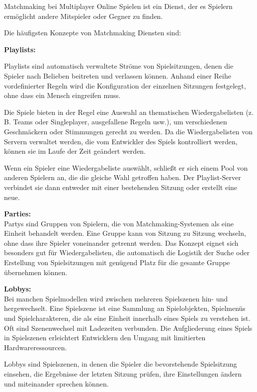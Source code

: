 Matchmaking bei Multiplayer Online Spielen ist ein Dienst, der es Spielern ermöglicht andere Mitspieler oder Gegner zu finden. \cite{.2014}

Die häufigsten Konzepte von Matchmaking Diensten sind:

\textbf{Playlists:}

Playlists sind automatisch verwaltete Ströme von Spielsitzungen, denen die Spieler nach Belieben beitreten und verlassen können. Anhand einer Reihe vordefinierter Regeln wird die Konfiguration der einzelnen Sitzungen festgelegt, ohne dass ein Mensch eingreifen muss.  

Die Spiele bieten in der Regel eine Auswahl an thematischen Wiedergabelisten (z. B. Teams oder Singleplayer, ausgefallene Regeln usw.), um verschiedenen Geschmäckern oder Stimmungen gerecht zu werden. Da die Wiedergabelisten von Servern verwaltet werden, die vom Entwickler des Spiels kontrolliert werden, können sie im Laufe der Zeit geändert werden.

Wenn ein Spieler eine Wiedergabeliste auswählt, schließt er sich einem Pool von anderen Spielern an, die die gleiche Wahl getroffen haben. Der Playlist-Server verbindet sie dann entweder mit einer bestehenden Sitzung oder erstellt eine neue. 

\cite{Wikipedia.2021b}

\textbf{Parties:} \\
Partys sind Gruppen von Spielern, die von Matchmaking-Systemen als eine Einheit behandelt werden. Eine Gruppe kann von Sitzung zu Sitzung wechseln, ohne dass ihre Spieler voneinander getrennt werden. Das Konzept eignet sich besonders gut für Wiedergabelisten, die automatisch die Logistik der Suche oder Erstellung von Spielsitzungen mit genügend Platz für die gesamte Gruppe übernehmen können.

\cite{Wikipedia.2021b} 

\textbf{Lobbys:} \\
Bei manchen Spielmodellen wird zwischen mehreren Spielszenen hin- und hergewechselt. Eine Spielszene ist eine Sammlung an Spielobjekten, Spielmenüs und Spielcharakteren, die als eine Einheit innerhalb eines Spiels zu verstehen ist. Oft sind Szenenwechsel mit Ladezeiten verbunden. Die Aufgliederung eines Spiels in Spielszenen erleichtert Entwicklern den Umgang mit limitierten Hardwareressourcen. \cite{Wikipedia.2012}

Lobbys sind Spielszenen, in denen die Spieler die bevorstehende Spielsitzung einsehen, die Ergebnisse der letzten Sitzung prüfen, ihre Einstellungen ändern und miteinander sprechen können.

